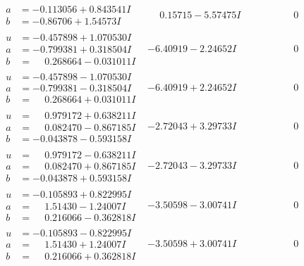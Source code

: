 \documentclass[1p]{elsarticle_modified}
\theoremstyle{definition}
\begin{document}
$$\begin{array}{c|c|c}
\begin{aligned}
a &= -0.113056 + 0.843541 I \\
b &= -0.86706 + 1.54573 I\end{aligned}
 & \phantom{-}0.15715 - 5.57475 I & \phantom{-0.000000 } 0 \\ \hline\begin{aligned}
u &= -0.457898 + 1.070530 I \\
a &= -0.799381 + 0.318504 I \\
b &= \phantom{-}0.268664 - 0.031011 I\end{aligned}
 & -6.40919 - 2.24652 I & \phantom{-0.000000 } 0 \\ \hline\begin{aligned}
u &= -0.457898 - 1.070530 I \\
a &= -0.799381 - 0.318504 I \\
b &= \phantom{-}0.268664 + 0.031011 I\end{aligned}
 & -6.40919 + 2.24652 I & \phantom{-0.000000 } 0 \\ \hline\begin{aligned}
u &= \phantom{-}0.979172 + 0.638211 I \\
a &= \phantom{-}0.082470 - 0.867185 I \\
b &= -0.043878 - 0.593158 I\end{aligned}
 & -2.72043 + 3.29733 I & \phantom{-0.000000 } 0 \\ \hline\begin{aligned}
u &= \phantom{-}0.979172 - 0.638211 I \\
a &= \phantom{-}0.082470 + 0.867185 I \\
b &= -0.043878 + 0.593158 I\end{aligned}
 & -2.72043 - 3.29733 I & \phantom{-0.000000 } 0 \\ \hline\begin{aligned}
u &= -0.105893 + 0.822995 I \\
a &= \phantom{-}1.51430 - 1.24007 I \\
b &= \phantom{-}0.216066 - 0.362818 I\end{aligned}
 & -3.50598 - 3.00741 I & \phantom{-0.000000 } 0 \\ \hline\begin{aligned}
u &= -0.105893 - 0.822995 I \\
a &= \phantom{-}1.51430 + 1.24007 I \\
b &= \phantom{-}0.216066 + 0.362818 I\end{aligned}
 & -3.50598 + 3.00741 I & \phantom{-0.000000 } 0\\

\end{array}$$
\end{document}
